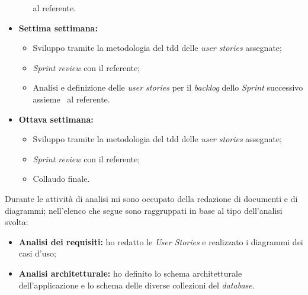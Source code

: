 \begin{itemize}
\begin{itemize}
      al referente.
    \end{itemize}
  \item \textbf{Settima settimana:} 
    \begin{itemize}
      \item Sviluppo tramite la metodologia del \acrshort{tdd} delle \emph{user stories} assegnate;
      \item \emph{Sprint review} con il referente;
      \item Analisi e definizione delle \emph{user stories} per il \emph{backlog} dello \emph{Sprint} successivo assieme \
      al referente.
    \end{itemize}
  \item \textbf{Ottava settimana:} 
    \begin{itemize}
      \item Sviluppo tramite la metodologia del \acrshort{tdd} delle \emph{user stories} assegnate;
      \item \emph{Sprint review} con il referente;
      \item Collaudo finale.
    \end{itemize}
\end{itemize}

Durante le attività di analisi mi sono occupato della redazione di documenti e di diagrammi; nell'elenco che segue sono raggruppati in base al tipo dell'analisi svolta:
\begin{itemize}
  \item \textbf{Analisi dei requisiti:} ho redatto le \emph{User Stories} e realizzato i diagrammi dei casi d'uso;
  \item \textbf{Analisi architetturale:} ho definito lo schema architetturale dell'applicazione e lo schema delle diverse collezioni del \emph{database}.
\end{itemize}
